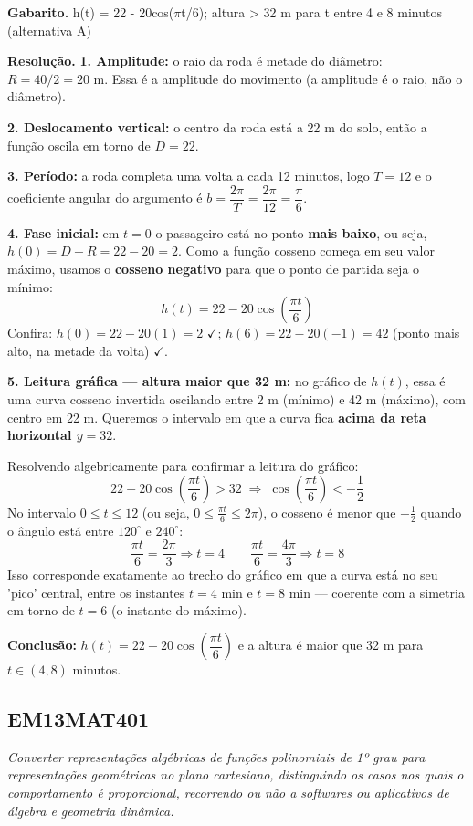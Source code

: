 \documentclass[11pt,a4paper]{article}
\begin{document}
\textbf{Gabarito.} h(t) = 22 - 20cos($\pi$t/6); altura > 32 m para t entre 4 e 8 minutos (alternativa A)

\textbf{Resolução.} \textbf{1. Amplitude:} o raio da roda é metade do diâmetro: $R = 40/2 = 20$ m. Essa é a amplitude do movimento (a amplitude é o raio, não o diâmetro).

\textbf{2. Deslocamento vertical:} o centro da roda está a 22 m do solo, então a função oscila em torno de $D = 22$.

\textbf{3. Período:} a roda completa uma volta a cada 12 minutos, logo $T = 12$ e o coeficiente angular do argumento é $b = \dfrac{2\pi}{T} = \dfrac{2\pi}{12} = \dfrac{\pi}{6}$.

\textbf{4. Fase inicial:} em $t=0$ o passageiro está no ponto \textbf{mais baixo}, ou seja, $h(0) = D - R = 22 - 20 = 2$. Como a função cosseno começa em seu valor máximo, usamos o \textbf{cosseno negativo} para que o ponto de partida seja o mínimo:
$$h(t) = 22 - 20\cos\left(\frac{\pi t}{6}\right)$$
Confira: $h(0) = 22 - 20(1) = 2$ $\checkmark$; $h(6) = 22 - 20(-1) = 42$ (ponto mais alto, na metade da volta) $\checkmark$.

\textbf{5. Leitura gráfica — altura maior que 32 m:} no gráfico de $h(t)$, essa é uma curva cosseno invertida oscilando entre 2 m (mínimo) e 42 m (máximo), com centro em 22 m. Queremos o intervalo em que a curva fica \textbf{acima da reta horizontal $y=32$}.

Resolvendo algebricamente para confirmar a leitura do gráfico:
$$22 - 20\cos\left(\frac{\pi t}{6}\right) > 32 \;\Rightarrow\; \cos\left(\frac{\pi t}{6}\right) < -\frac{1}{2}$$
No intervalo $0 \le t \le 12$ (ou seja, $0 \le \frac{\pi t}{6} \le 2\pi$), o cosseno é menor que $-\tfrac12$ quando o ângulo está entre $120^\circ $ e $240^\circ $:
$$\frac{\pi t}{6} = \frac{2\pi}{3} \Rightarrow t = 4 \qquad \frac{\pi t}{6} = \frac{4\pi}{3} \Rightarrow t = 8$$
Isso corresponde exatamente ao trecho do gráfico em que a curva está no seu 'pico' central, entre os instantes $t=4$ min e $t=8$ min — coerente com a simetria em torno de $t=6$ (o instante do máximo).

\textbf{Conclusão:} $h(t) = 22 - 20\cos\left(\dfrac{\pi t}{6}\right)$ e a altura é maior que 32 m para $t \in (4, 8)$ minutos.
\subsection*{EM13MAT401}
{\small\itshape Converter representações algébricas de funções polinomiais de 1º grau para representações geométricas no plano cartesiano, distinguindo os casos nos quais o comportamento é proporcional, recorrendo ou não a softwares ou aplicativos de álgebra e geometria dinâmica.}
\end{document}
